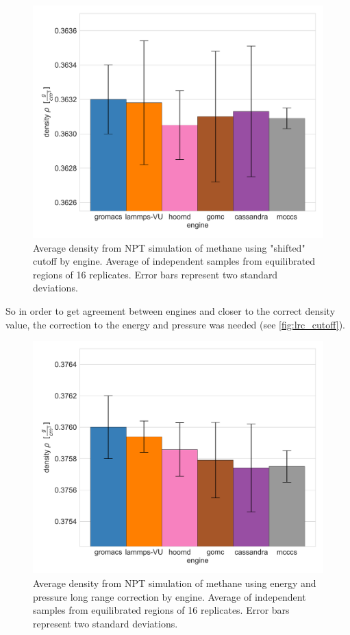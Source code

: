 \begin{figure}[h!]
    \centering
    \includegraphics[width=0.8\linewidth,keepaspectratio]{figures/rep_study/shift_cutoff.png}
    \caption{Average density from NPT simulation of methane using "shifted" cutoff by engine. Average of independent samples from equilibrated regions of 16 replicates. Error bars represent two standard deviations.}\label{fig:shift_cutoff}
\end{figure}
So in order to get agreement between engines and closer to the correct density value, the correction to the energy and pressure was needed (see \autoref{fig:lrc_cutoff}).
\begin{figure}[h!]
    \centering
    \includegraphics[width=0.8\linewidth,keepaspectratio]{figures/rep_study/lrc_cutoff.png}
    \caption{Average density from NPT simulation of methane using energy and pressure long range correction by engine. Average of independent samples from equilibrated regions of 16 replicates. Error bars represent two standard deviations.}\label{fig:lrc_cutoff}
\end{figure}

